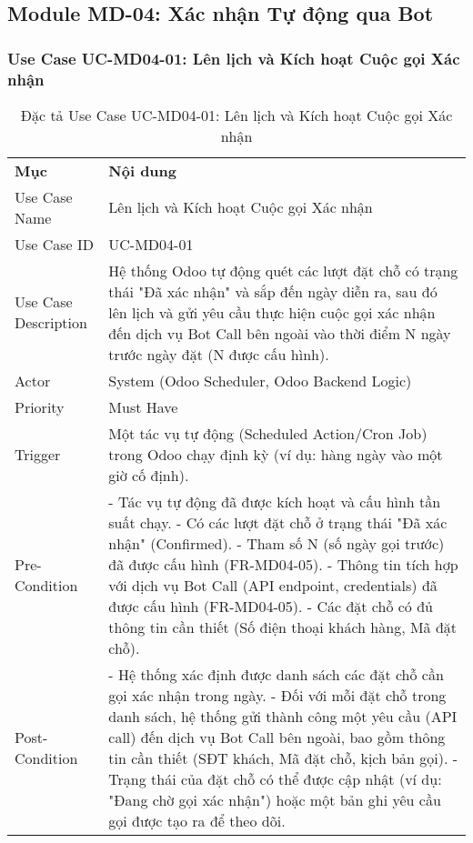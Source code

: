 \subsection{Module MD-04: Xác nhận Tự động qua Bot}

\subsubsection{Use Case UC-MD04-01: Lên lịch và Kích hoạt Cuộc gọi Xác nhận}

\begin{longtable}{|m{4cm}|p{11cm}|}
\caption{Đặc tả Use Case UC-MD04-01: Lên lịch và Kích hoạt Cuộc gọi Xác nhận} \label{tab:uc_md04_01} \\
\hline

\endhead %
\hline
\endfoot %
\hline
\endlastfoot %
\multicolumn{2}{|c|}{\textbf{2.1. Tóm tắt (Summary)}} \\
\hline
\textbf{Mục} & \textbf{Nội dung} \\
\hline
Use Case Name & Lên lịch và Kích hoạt Cuộc gọi Xác nhận \\
\hline
Use Case ID & UC-MD04-01 \\
\hline
Use Case Description & Hệ thống Odoo tự động quét các lượt đặt chỗ có trạng thái "Đã xác nhận" và sắp đến ngày diễn ra, sau đó lên lịch và gửi yêu cầu thực hiện cuộc gọi xác nhận đến dịch vụ Bot Call bên ngoài vào thời điểm N ngày trước ngày đặt (N được cấu hình). \\
\hline
Actor & System (Odoo Scheduler, Odoo Backend Logic) \\
\hline
Priority & Must Have \\
\hline
Trigger & Một tác vụ tự động (Scheduled Action/Cron Job) trong Odoo chạy định kỳ (ví dụ: hàng ngày vào một giờ cố định). \\
\hline
Pre-Condition & - Tác vụ tự động đã được kích hoạt và cấu hình tần suất chạy. \newline - Có các lượt đặt chỗ ở trạng thái "Đã xác nhận" (Confirmed). \newline - Tham số N (số ngày gọi trước) đã được cấu hình (FR-MD04-05). \newline - Thông tin tích hợp với dịch vụ Bot Call (API endpoint, credentials) đã được cấu hình (FR-MD04-05). \newline - Các đặt chỗ có đủ thông tin cần thiết (Số điện thoại khách hàng, Mã đặt chỗ). \\
\hline
Post-Condition & - Hệ thống xác định được danh sách các đặt chỗ cần gọi xác nhận trong ngày. \newline - Đối với mỗi đặt chỗ trong danh sách, hệ thống gửi thành công một yêu cầu (API call) đến dịch vụ Bot Call bên ngoài, bao gồm thông tin cần thiết (SĐT khách, Mã đặt chỗ, kịch bản gọi). \newline - Trạng thái của đặt chỗ có thể được cập nhật (ví dụ: "Đang chờ gọi xác nhận") hoặc một bản ghi yêu cầu gọi được tạo ra để theo dõi. \\

\end{longtable}
